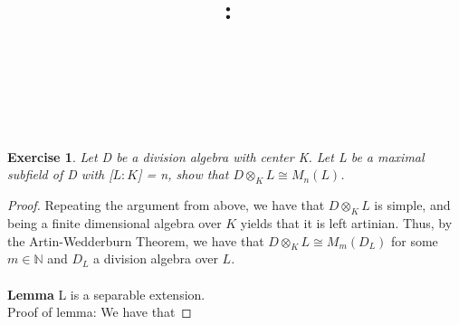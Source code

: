 \documentclass{article}
\title{
    \vspace{2in}
    \textmd{\textbf{\hmwkClass:\ \hmwkTitle}}\\
    \vspace{0.1in}
    \textmd{\hmwkDueDate} \\
    \vspace{0.2in}\large{\textit{\hmwkClassInstructor\  }}
    \vspace{2in}
}
\author{\hmwkAuthorName}
\date{}
\newcommand{\bb}[1]{\mathbb{#1}}
\newcommand{\iso}{\cong}
\newtheorem{exercise}{Exercise}
\begin{document}
\maketitle
\newpage

\begin{exercise}
  Let D be a division algebra with center K. Let L be a maximal subfield of D with \emph{[$L:K$]} = n, show that $D \otimes_{K}L \iso M_{n}(L)$.  
\end{exercise}
\begin{proof}
  Repeating the argument from above, we have that $D \otimes_{K} L$ is simple, and being a finite dimensional algebra over $K$ yields that it is left artinian. Thus, by the Artin-Wedderburn Theorem, we have that $D \otimes_{K} L \iso M_{m}(D_{L})$ for some $m \in \bb{N}$ and $D_{L}$ a division algebra over $L$. \\ \\
  \textbf{Lemma} L is a separable extension. \\
  Proof of lemma: We have that  
\end{proof}
\end{document}
